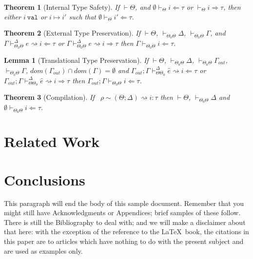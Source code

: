 \documentclass{sig-alternate}
\newtheorem{theorem}{Theorem}
\newtheorem{lemma}{Lemma}
\begin{document}
\begin{theorem}[Internal Type Safety]
If $\vdash\Theta$, and $\emptyset\vdash_{\Theta}i\Leftarrow\tau$ or $\vdash_{\Theta}i\Rightarrow\tau$, then either $i~\texttt{val}$ or $i\mapsto i'$ such that $\emptyset\vdash_{\Theta}i'\Leftarrow\tau$.
\end{theorem}

\begin{theorem}[External Type Preservation]
If $\vdash\Theta$, $\vdash_{\Theta_0\Theta}\Delta$, $\vdash_{\Theta_0\Theta}\Gamma$, and $\Gamma\vdash_{\Theta_0\Theta}^{\Delta} e\rightsquigarrow i\Leftarrow\tau$ or $\Gamma\vdash_{\Theta_0\Theta}^{\Delta} e\rightsquigarrow i\Rightarrow\tau$ then $\Gamma\vdash_{\Theta_0\Theta} i\Leftarrow\tau$.
\end{theorem}

\begin{lemma}[Translational Type Preservation]
If $\vdash\Theta$, $\vdash_{\Theta_0\Theta} \Delta$, $\vdash_{\Theta_0\Theta}\Gamma_{out}$, $\vdash_{\Theta_0\Theta}\Gamma$, $dom(\Gamma_{out})\cap dom(\Gamma)=\emptyset$ and $\Gamma_{out};\Gamma\vdash_{\Theta\Theta_0}^{\Delta}\hat{e}\rightsquigarrow i\Leftarrow\tau$ or $\Gamma_{out};\Gamma\vdash_{\Theta\Theta_0}^{\Delta}\hat{e}\rightsquigarrow i\Rightarrow \tau$ then $\Gamma_{out};\Gamma\vdash_{\Theta_0\Theta}i\Leftarrow \tau$.
\end{lemma}

\begin{theorem}[Compilation]
If ~$\rho\sim(\Theta;\Delta)\rightsquigarrow i:\tau$ then $\vdash\Theta$, $\vdash_{\Theta_0\Theta}\Delta$ and $\emptyset\vdash_{\Theta_0\Theta} i\Leftarrow\tau$.
\end{theorem}

%

\section{Related Work}\label{related}
\section{Conclusions}
This paragraph will end the body of this sample document.
Remember that you might still have Acknowledgments or
Appendices; brief samples of these
follow.  There is still the Bibliography to deal with; and
we will make a disclaimer about that here: with the exception
of the reference to the \LaTeX\ book, the citations in
this paper are to articles which have nothing to
do with the present subject and are used as
examples only.
\end{document}
